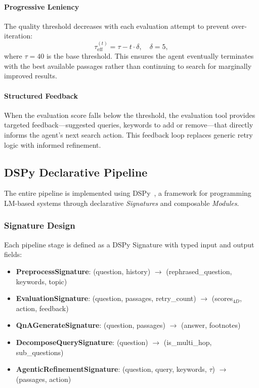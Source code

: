 \paragraph{Progressive Leniency}
The quality threshold decreases with each evaluation attempt to prevent over-iteration:
\begin{equation}
    \tau_{\text{eff}}^{(t)} = \tau - t \cdot \delta, \quad \delta = 5,
    \label{eq:progressive}
\end{equation}
where $\tau = 40$ is the base threshold.
This ensures the agent eventually terminates with the best available passages rather than continuing to search for marginally improved results.

\paragraph{Structured Feedback}
When the evaluation score falls below the threshold, the evaluation tool provides targeted feedback---suggested queries, keywords to add or remove---that directly informs the agent's next search action.
This feedback loop replaces generic retry logic with informed refinement.

\subsection{DSPy Declarative Pipeline}
\label{subsec:dspy}

The entire \ours{} pipeline is implemented using DSPy~\cite{khattab2024dspy}, a framework for programming LM-based systems through declarative \emph{Signatures} and composable \emph{Modules}.

\subsubsection{Signature Design}
\label{subsubsec:signatures}

Each pipeline stage is defined as a DSPy Signature with typed input and output fields:

{\small
\begin{itemize}
    \item \textbf{PreprocessSignature}: (question, history) $\rightarrow$ (rephrased\_question, keywords, topic)
    \item \textbf{EvaluationSignature}: (question, passages, retry\_count) $\rightarrow$ (scores$_{4D}$, action, feedback)
    \item \textbf{QnAGenerateSignature}: (question, passages) $\rightarrow$ (answer, footnotes)
    \item \textbf{DecomposeQuerySignature}: (question) $\rightarrow$ (is\_multi\_hop, sub\_questions)
    \item \textbf{AgenticRefinementSignature}: (question, query, keywords, $\tau$) $\rightarrow$ (passages, action)
\end{itemize}
}


